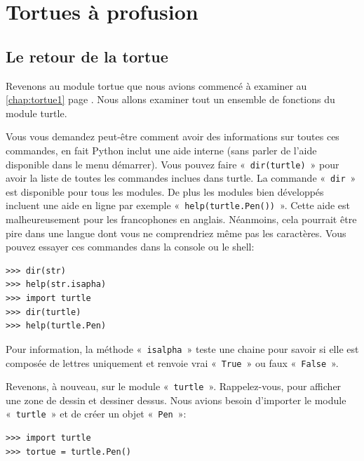 




\chapter{Tortues à profusion\label{chap:tortue2}}
\section{Le retour de la tortue}
Revenons au module tortue que nous avions commencé à examiner au \autoref{chap:tortue1} page \pageref{chap:tortue1}. Nous allons examiner tout un ensemble de fonctions du module turtle. 

Vous vous demandez peut-être comment avoir des informations sur toutes ces commandes, en fait Python inclut une aide interne (sans parler de l'aide disponible dans le menu démarrer). Vous pouvez faire « \texttt{dir(turtle)} » pour avoir la liste de toutes les commandes inclues dans turtle. La commande « \texttt{dir} » est disponible pour tous les modules. De plus les modules bien développés incluent une aide en ligne par exemple « \texttt{help(turtle.Pen())} ». Cette aide est malheureusement pour les francophones en anglais. Néanmoins, cela pourrait être pire dans une langue dont vous  ne comprendriez même pas les caractères. Vous pouvez essayer ces commandes dans la console ou le shell:

\begin{Verbatim}[frame=single,rulecolor=\color{mbleu}, label=à taper]
>>> dir(str)
>>> help(str.isapha)
>>> import turtle
>>> dir(turtle)
>>> help(turtle.Pen)
\end{Verbatim}

Pour information, la méthode « \texttt{isalpha} » teste une chaine pour savoir si elle est composée de lettres uniquement et renvoie vrai « \texttt{True} » ou faux « \texttt{False} ».

Revenons, à  nouveau, sur le module « \texttt{turtle} ». Rappelez-vous, pour afficher une zone de dessin et dessiner dessus. Nous avions besoin d'importer le module « \texttt{turtle} » et de créer un objet « \texttt{Pen} »:
\begin{Verbatim}[frame=single,rulecolor=\color{gray}, label=ne pas saisir]
>>> import turtle
>>> tortue = turtle.Pen()
\end{Verbatim}

